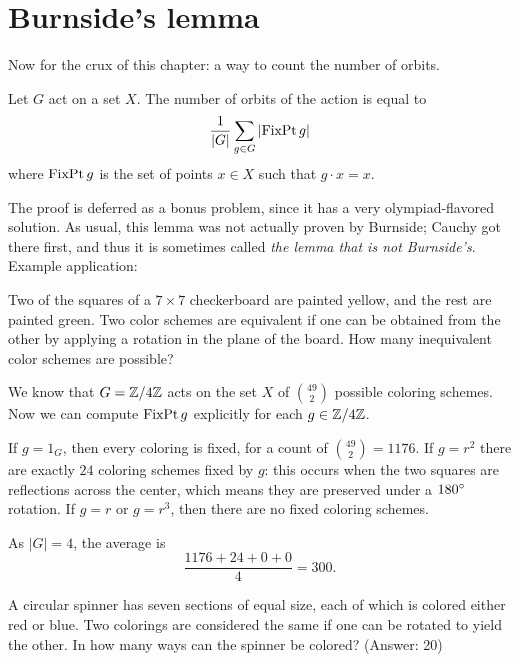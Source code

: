 \section{Burnside's lemma}
Now for the crux of this chapter: a way to count the number of orbits.
\begin{theorem}
	Let $G$ act on a set $X$.
	The number of orbits of the action is equal to
	\[ \frac{1}{\left\lvert G \right\rvert}
		\sum_{g \in G} \left\lvert \operatorname{FixPt} g \right\rvert \]
	where $\operatorname{FixPt} g$ is the set of points $x \in X$
	such that $g \cdot x = x$.
\end{theorem}
The proof is deferred as a bonus problem,
since it has a very olympiad-flavored solution.
As usual, this lemma was not actually proven by Burnside;
Cauchy got there first, and thus it is sometimes called
\emph{the lemma that is not Burnside's}.
Example application:
\begin{example}
	[AIME 1996]
	{ \footnotesize Two of the squares of a $7 \times 7$ checkerboard are painted yellow, and the rest are painted green. Two color schemes are equivalent if one can be obtained from the other by applying a rotation in the plane of the board. How many inequivalent color schemes are possible?  }

	We know that $G = \mathbb Z/4\mathbb Z$ acts on the set $X$ of $\binom{49}{2}$ possible coloring schemes.
	Now we can compute $\operatorname{FixPt} g$ explicitly for each $g \in \mathbb Z/4\mathbb Z$.
	\begin{itemize}
		\ii If $g = 1_G$, then every coloring is fixed, for a count of $\binom{49}{2} = 1176$.
		\ii If $g = r^2$ there are exactly $24$ coloring schemes fixed by $g$:
		this occurs when the two squares are reflections across the center,
		which means they are preserved under a $180^\circ$ rotation.
		\ii If $g = r$ or $g=r^3$, then there are no fixed coloring schemes.
	\end{itemize}
	As $\left\lvert G \right\rvert = 4$, the average is
	\[ \frac{1176 + 24 + 0 + 0}{4} = 300. \]
\end{example}

\begin{exercise}
	A circular spinner has seven sections of equal size,
	each of which is colored either red or blue.
	Two colorings are considered the same if one can be rotated to yield the other.
	In how many ways can the spinner be colored? (Answer: 20)
\end{exercise}

